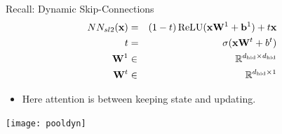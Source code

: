 \documentclass{beamer}
\begin{document}
\begin{frame}{Recall: Dynamic Skip-Connections}
  \begin{eqnarray*}
    NN_{sl2}(\boldx) &=& (1-t) \relu(\boldx \boldW^1 + \boldb^1) + t \boldx \\
    t &=& \sigma(\boldx \boldW^t + b^t) \\
    \boldW^1 &\in& \reals^{\dhid \times \dhid} \\
    \boldW^t &\in& \reals^{\dhid \times 1} 
  \end{eqnarray*}



    \begin{itemize}
    \item Here attention is between keeping state and updating.
    \end{itemize}
  \begin{center}
    \texttt{[image: pooldyn]}
  \end{center}
\end{frame}



\end{document}
